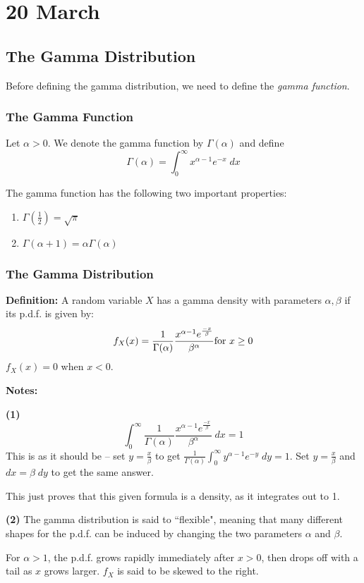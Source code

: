 \documentclass[12pt]{article}
\begin{document}
\section{20 March}
\subsection{The Gamma Distribution}
Before defining the gamma distribution, we need to define the \emph{gamma function}.

\subsubsection{The Gamma Function}
Let $\alpha> 0$. We denote the gamma function by $\Gamma (\alpha)$ and define
\[
    \Gamma(\alpha) = \int_0^{\infty} x^{\alpha - 1} e^{-x} \; dx
\]

The gamma function has the following two important properties:
\begin{enumerate}
    \item $\Gamma (\frac{1}{2}) = \sqrt{\pi}$
    \item $\Gamma(\alpha + 1) = \alpha \Gamma(\alpha)$
\end{enumerate}

\subsubsection{The Gamma Distribution}
\textbf{Definition:} A random variable $X$ has a gamma density with parameters $\alpha, \beta$ if its p.d.f. is given by:
\[
    f_X (x) = \frac{1}{\Gamma(\alpha)} \frac{x^{\alpha -1} e^{\frac{-x}{\beta}}}{\beta^{\alpha}} \textnormal{for $x \geq 0$}
\]  
$f_X (x) = 0$ when $x < 0$.

        \textbf{Notes:}

\textbf{(1)} 
\[
    \int_0^{\infty} \frac{1}{\Gamma(\alpha)} \frac{x^{\alpha -1}e^{\frac{-x}{\beta}}}{\beta^{\alpha}} \; dx = 1
\]
This is as it should be -- set $y = \frac{x}{\beta}$ to get $\frac{1}{\Gamma(\alpha)} \int_0^{\infty} y^{\alpha -1}e^{-y} \; dy = 1$. Set $y=\frac{x}{\beta}$ and $dx = \beta \; dy$ to get the same answer.

This just proves that this given formula is a density, as it integrates out to 1.

\textbf{(2)}
The gamma distribution is said to ``flexible", meaning that many different shapes for the p.d.f. can be induced by changing the two parameters $\alpha$ and $\beta$.

For $\alpha > 1$, the p.d.f. grows rapidly immediately after $x > 0$, then drops off with a tail as $x$ grows larger. $f_X$ is said to be skewed to the right.
\end{document}
